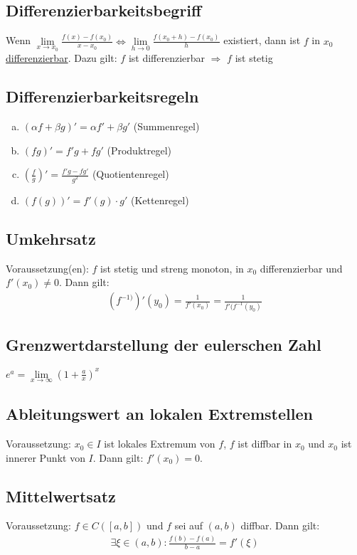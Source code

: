 \documentclass{article}
\begin{document}
\subsection{Differenzierbarkeitsbegriff}
Wenn $\lim \limits_{x \to x_0} \frac{f(x) - f(x_0)}{x - x_0}\Leftrightarrow \lim \limits_{h \to 0} \frac{f(x_0 + h) - f(x_0)}{h}$ existiert,
dann ist $f$ in $x_0$ \underline{differenzierbar}. Dazu gilt: $f$ ist differenzierbar $\Rightarrow$ $f$ ist stetig

\subsection{Differenzierbarkeitsregeln}
\begin{enumerate}[a)]
    \item $(\alpha f + \beta g)' = \alpha f' + \beta g'$ (Summenregel)
    \item $(fg)' = f'g + fg'$ (Produktregel)
    \item $(\frac{f}{g})' = \frac{f'g - fg'}{g^2}$ (Quotientenregel)
    \item $(f(g))' = f'(g) \cdot g'$ (Kettenregel)
\end{enumerate}

\subsection{Umkehrsatz}
Voraussetzung(en): $f$ ist stetig und streng monoton, in $x_0$ differenzierbar und $f'(x_0) \neq 0$. Dann gilt: \\
\begin{align*}
    (f^{-1)})'(y_0) = \frac{1}{f'(x_0)} = \frac{1}{f'(f^{-1}(y_0)}
\end{align*}

\subsection{Grenzwertdarstellung der eulerschen Zahl}
$e^{a} = \lim \limits_{x \to \infty} (1 + \frac{a}{x})^x$

\subsection{Ableitungswert an lokalen Extremstellen}
Voraussetzung: $x_0 \in I$ ist lokales Extremum von $f$, $f$ ist diffbar in $x_0$ und $x_0$ ist innerer Punkt von $I$. Dann gilt: $f'(x_0) = 0$.

\subsection{Mittelwertsatz}
Voraussetzung: $f \in C([a,b])$ und $f$ sei auf $(a,b)$ diffbar. Dann gilt: 
\begin{align*}
    \exists \xi \in (a,b): \frac{f(b) - f(a)}{b-a} = f'(\xi)
\end{align*}
\end{document}
